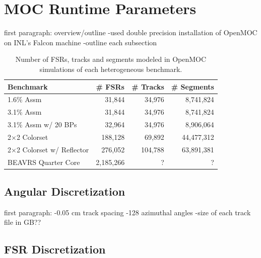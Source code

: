 \section{\ac{MOC} Runtime Parameters}
\label{sec:chap8-moc-params}

first paragraph: overview/outline
-used double precision installation of OpenMOC on INL's Falcon machine
-outline each subsection

\begin{table}[h!]
  \centering
  \caption[Number of \ac{FSR}s, tracks and segments for each heterogeneous benchmark]{Number of \ac{FSR}s, tracks and segments modeled in OpenMOC simulations of each heterogeneous benchmark.}
  \small
  \label{table:chap8-num-fsrs-tracks-segments}
  \vspace{6pt}
  \begin{tabular}{l r r r}
  \toprule
  \rowcolor{lightgray}
  \textbf{Benchmark} &
  \multicolumn{1}{c}{\cellcolor{lightgray} \textbf{\# \ac{FSR}s}} &
  \multicolumn{1}{c}{\cellcolor{lightgray} \textbf{\# Tracks}} &
  \multicolumn{1}{c}{\cellcolor{lightgray} \textbf{\# Segments}} \\
  \midrule
1.6\% Assm & 31,844 & 34,976 & 8,741,824 \\
  \midrule
3.1\% Assm & 31,844 & 34,976 & 8,741,824 \\
  \midrule
3.1\% Assm w/ 20 BPs & 32,964 & 34,976 & 8,906,064  \\
  \midrule
2$\times$2 Colorset & 188,128 & 69,892 & 44,477,312 \\
  \midrule
2$\times$2 Colorset w/ Reflector & 276,052 & 104,788 & 63,891,381 \\
  \midrule
\ac{BEAVRS} Quarter Core & 2,185,266 & ? & ? \\
  \bottomrule
\end{tabular}
\end{table}


\subsection{Angular Discretization}
\label{subsec:chap8-angular-discretizations}

first paragraph: 
-0.05 cm track spacing
-128 azimuthal angles
-size of each track file in GB??

\subsection{\ac{FSR} Discretization}
\label{subsec:chap8-fsr-discretizations}

